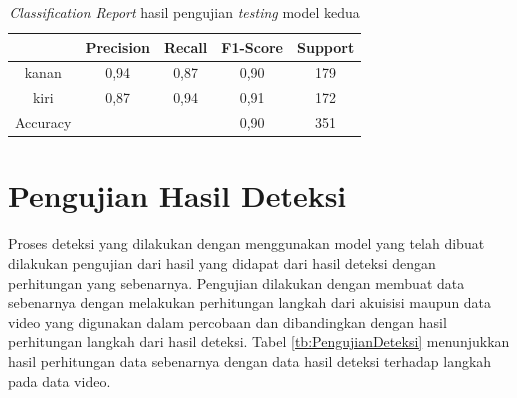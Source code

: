 \begin{longtable}{|c|c|c|c|c|}
  \caption{\emph{Classification Report} hasil pengujian \emph{testing} model kedua}
  \label{tb:ClassificationReportModel2}                                   \\
  \hline
  \rowcolor[HTML]{C0C0C0}
   & \textbf{Precision} & \textbf{Recall} & \textbf{F1-Score} & \textbf{Support} \\
  \hline
  kanan     & 0,94    & 0,87    & 0,90    & 179         \\
  \hline
  kiri      & 0,87    & 0,94    & 0,91    & 172           \\
  \hline
  Accuracy  &         &         & 0,90    & 351            \\
  \hline
\end{longtable}

\section{Pengujian Hasil Deteksi}
\label{sec:PengujianDeteksi}

Proses deteksi yang dilakukan dengan menggunakan model yang telah dibuat dilakukan pengujian dari hasil yang didapat dari hasil deteksi dengan perhitungan yang sebenarnya. Pengujian dilakukan dengan membuat data sebenarnya dengan melakukan perhitungan langkah dari akuisisi maupun data video yang digunakan dalam percobaan dan dibandingkan dengan hasil perhitungan langkah dari hasil deteksi. Tabel \ref{tb:PengujianDeteksi} menunjukkan hasil perhitungan data sebenarnya dengan data hasil deteksi terhadap langkah pada data video. 

